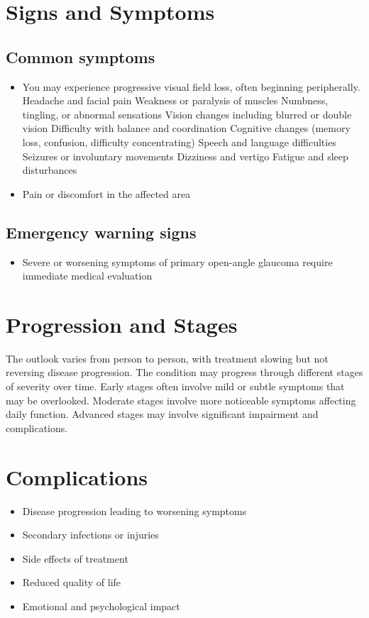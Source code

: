 \section{Signs and Symptoms}
\subsection{Common symptoms}
\begin{itemize}[noitemsep]
  \item You may experience progressive visual field loss, often beginning peripherally. Headache and facial pain Weakness or paralysis of muscles Numbness, tingling, or abnormal sensations Vision changes including blurred or double vision Difficulty with balance and coordination Cognitive changes (memory loss, confusion, difficulty concentrating) Speech and language difficulties Seizures or involuntary movements Dizziness and vertigo Fatigue and sleep disturbances
  \item Pain or discomfort in the affected area
  \end{itemize}
\subsection{Emergency warning signs}
\begin{itemize}[noitemsep]
  \item Severe or worsening symptoms of primary open-angle glaucoma require immediate medical evaluation
\end{itemize}
\section{Progression and Stages}
The outlook varies from person to person, with treatment slowing but not reversing disease progression. The condition may progress through different stages of severity over time. Early stages often involve mild or subtle symptoms that may be overlooked. Moderate stages involve more noticeable symptoms affecting daily function. Advanced stages may involve significant impairment and complications.
\section{Complications}
\begin{itemize}[noitemsep]
  \item Disease progression leading to worsening symptoms
  \item Secondary infections or injuries
  \item Side effects of treatment
  \item Reduced quality of life
  \item Emotional and psychological impact
\end{itemize}

